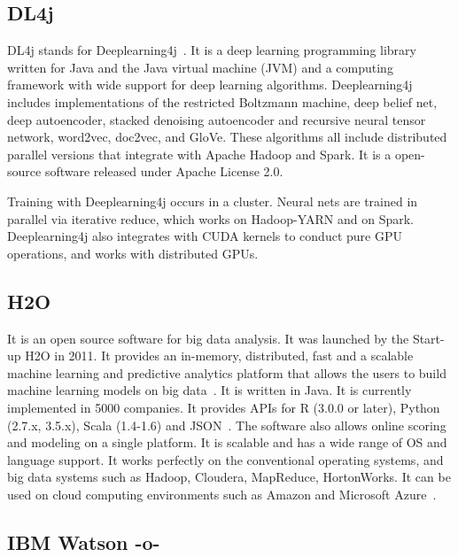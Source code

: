 \subsection{DL4j}

DL4j stands for Deeplearning4j~\cite{www-dl4j}. It is a deep learning
programming library written for Java and the Java virtual machine
(JVM) and a computing framework with wide support for deep learning
algorithms. Deeplearning4j includes implementations of the restricted
Boltzmann machine, deep belief net, deep autoencoder, stacked
denoising autoencoder and recursive neural tensor network, word2vec,
doc2vec, and GloVe. These algorithms all include distributed parallel
versions that integrate with Apache Hadoop and Spark. It is a
open-source software released under Apache License 2.0.

    Training with Deeplearning4j occurs in a cluster. Neural nets are
    trained in parallel via iterative reduce, which works on
    Hadoop-YARN and on Spark. Deeplearning4j also integrates with CUDA
    kernels to conduct pure GPU operations, and works with distributed
    GPUs.
	
\subsection{H2O}

It is an open source software for big data analysis. It was launched
by the Start-up H2O in 2011. It provides an in-memory, distributed,
fast and a scalable machine learning and predictive analytics platform
that allows the users to build machine learning models on big
data~\cite{www-H2O-website}. It is written in Java. It is currently
implemented in 5000 companies. It provides APIs for R (3.0.0 or
later), Python (2.7.x, 3.5.x), Scala (1.4-1.6) and
JSON~\cite{www-H2O-book}. The software also allows online scoring and
modeling on a single platform.  It is scalable and has a wide range of
OS and language support. It works perfectly on the conventional
operating systems, and big data systems such as Hadoop, Cloudera,
MapReduce, HortonWorks.  It can be used on cloud computing
environments such as Amazon and Microsoft Azure~\cite{www-H2O-wiki}.


\subsection{IBM Watson -o-}

